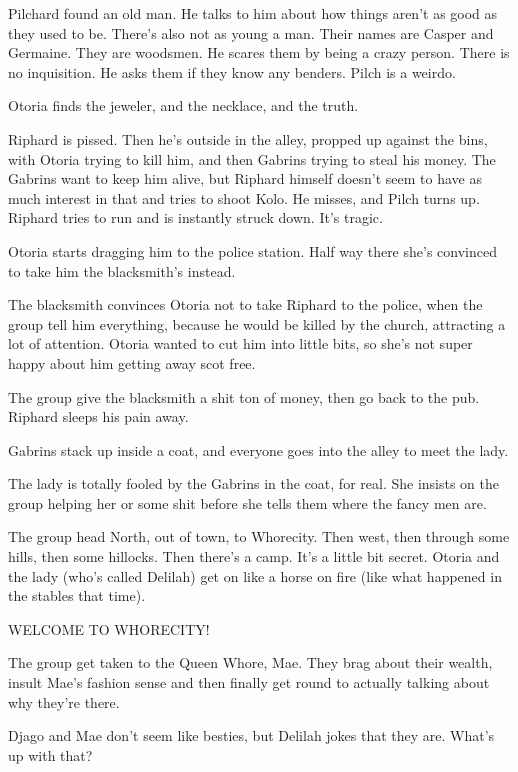 Pilchard found an old man. He talks to him about how things aren’t as good as they used to be. There’s also not as young a man. Their names are Casper and Germaine. They are woodsmen. He scares them by being a crazy person. There is no inquisition. He asks them if they know any benders. Pilch is a weirdo.\medskip

Otoria finds the jeweler, and the necklace, and the truth.\medskip

Riphard is pissed. Then he’s outside in the alley, propped up against the bins, with Otoria trying to kill him, and then Gabrins trying to steal his money. The Gabrins want to keep him alive, but Riphard himself doesn’t seem to have as much interest in that and tries to shoot Kolo. He misses, and Pilch turns up. Riphard tries to run and is instantly struck down. It’s tragic.\medskip

Otoria starts dragging him to the police station. Half way there she’s convinced to take him the blacksmith’s instead.\medskip

The blacksmith convinces Otoria not to take Riphard to the police, when the group tell him everything, because he would be killed by the church, attracting a lot of attention. Otoria wanted to cut him into little bits, so she’s not super happy about him getting away scot free.\medskip

The group give the blacksmith a shit ton of money, then go back to the pub. Riphard sleeps his pain away.\medskip

Gabrins stack up inside a coat, and everyone goes into the alley to meet the lady.\medskip

The lady is totally fooled by the Gabrins in the coat, for real. She insists on the group helping her or some shit before she tells them where the fancy men are.\medskip

The group head North, out of town, to Whorecity. Then west, then through some hills, then some hillocks. Then there’s a camp. It’s a little bit secret. Otoria and the lady (who’s called Delilah) get on like a horse on fire (like what happened in the stables that time).\medskip

WELCOME TO WHORECITY!\medskip

The group get taken to the Queen Whore, Mae. They brag about their wealth, insult Mae’s fashion sense and then finally get round to actually talking about why they’re there.\medskip

Djago and Mae don’t seem like besties, but Delilah jokes that they are. What’s up with that?\medskip

